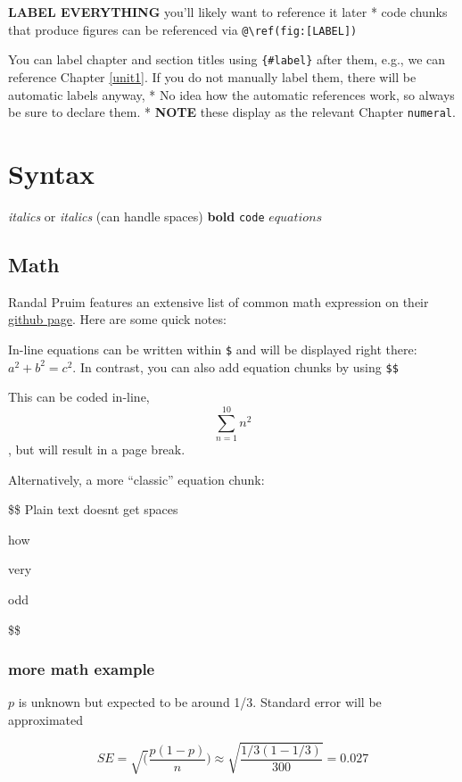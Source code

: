 \documentclass[
]{book}
\begin{document}
\textbf{LABEL EVERYTHING} you'll likely want to reference it later
* code chunks that produce figures can be referenced via \texttt{@\textbackslash{}ref(fig:{[}LABEL{]})}

You can label chapter and section titles using \texttt{\{\#label\}} after them, e.g., we can reference Chapter \ref{unit1}. If you do not manually label them, there will be automatic labels anyway,
* No idea how the automatic references work, so always be sure to declare them.
* \textbf{NOTE} these display as the relevant Chapter \texttt{numeral}.

\hypertarget{syntax}{%
\section{Syntax}\label{syntax}}

\emph{italics} or
\emph{italics} (can handle spaces)
\textbf{bold}
\texttt{code}
\(equations\)

\hypertarget{math}{%
\subsection{Math}\label{math}}

Randal Pruim features an extensive list of common math expression on their \href{https://rpruim.github.io/s341/S19/from-class/MathinRmd.html}{github page}. Here are some quick notes:

In-line equations can be written within \texttt{\$} and will be displayed right there: \(a^2 + b^2 = c^2\). In contrast, you can also add equation chunks by using \texttt{\$\$}

This can be coded in-line, \[\sum_{n=1}^{10} n^2\], but will result in a page break.

Alternatively, a more ``classic'' equation chunk:

\$\$
Plain text doesnt get spaces

how

very

odd

\$\$

\hypertarget{more-math-example}{%
\subsubsection{more math example}\label{more-math-example}}

\(p\) is unknown but expected to be around 1/3. Standard error will be approximated

\[
SE = \sqrt(\frac{p(1-p)}{n}) \approx \sqrt{\frac{1/3 (1 - 1/3)} {300}} = 0.027
\]
\end{document}
